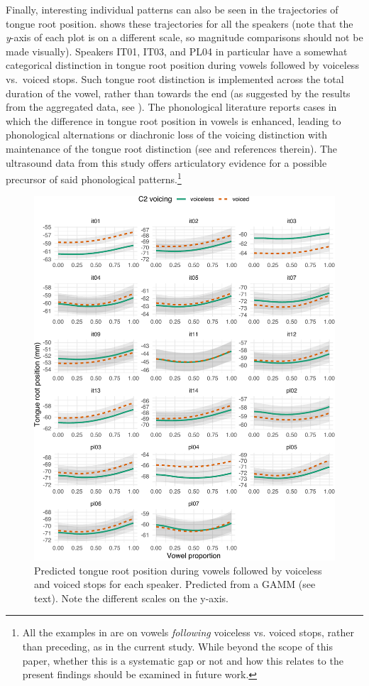 \documentclass[preprint]{JASAnew}
\begin{document}
Finally, interesting individual patterns can also be seen in the
trajectories of tongue root position.  shows these
trajectories for all the speakers (note that the \emph{y}-axis of each
plot is on a different scale, so magnitude comparisons should not be
made visually). Speakers IT01, IT03, and PL04 in particular have a
somewhat categorical distinction in tongue root position during vowels
followed by voiceless vs.~voiced stops. Such tongue root distinction is
implemented across the total duration of the vowel, rather than towards
the end (as suggested by the results from the aggregated data, see
). The phonological literature reports cases in which the
difference in tongue root position in vowels is enhanced, leading to
phonological alternations or diachronic loss of the voicing distinction
with maintenance of the tongue root distinction (see \citealt{vaux1996}
and references therein). The ultrasound data from this study offers
articulatory evidence for a possible precursor of said phonological
patterns.\footnote{All the examples in \citet{vaux1996} are on vowels \textit{following} voiceless vs. voiced stops, rather than preceding, as in the current study. While beyond the scope of this paper, whether this is a systematic gap or not and how this relates to the present findings should be examined in future work.}

\begin{figure}
\includegraphics[width=\linewidth]{./Figure9-1} \caption{Predicted tongue root position during vowels followed by voiceless and voiced stops for each speaker. Predicted from a GAMM (see text). Note the different scales on the y-axis.}\label{f:Figure9}
\end{figure}
\end{document}

